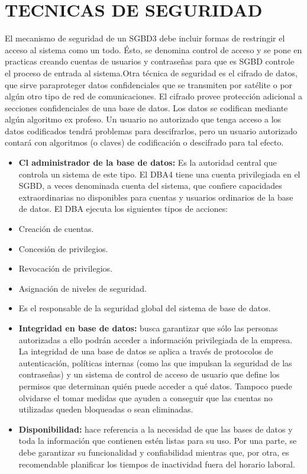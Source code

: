 \documentclass[conference]{IEEEtran}
\begin{document}
\section{TECNICAS DE SEGURIDAD}
El mecanismo de seguridad de un SGBD3 debe incluir formas de restringir el acceso al sistema como un todo. Ésto, se denomina control de acceso y se pone en practicas creando cuentas de usuarios y contraseñas para que es SGBD controle el proceso de entrada al sistema.Otra técnica de seguridad es el cifrado de datos, que sirve paraproteger datos confidenciales que se transmiten por satélite o por algún otro tipo de red de comunicaciones. El cifrado provee protección adicional a secciones confidenciales de una base de datos. Los datos se codifican mediante algún algoritmo ex profeso. Un usuario no autorizado que tenga acceso a los datos codificados tendrá problemas para descifrarlos, pero un usuario autorizado contará con algoritmos (o claves) de codificación o descifrado para tal efecto. 


\begin{itemize}
\item \textbf{Cl administrador de la base de datos: }Es la autoridad central que controla un sistema de este tipo. El DBA4 tiene una cuenta privilegiada en el SGBD, a veces denominada cuenta del sistema, que confiere capacidades extraordinarias no disponibles para cuentas y usuarios ordinarios de la base de datos. El DBA ejecuta los siguientes tipos de acciones:
\item \textbf{} Creación de cuentas.
\item \textbf{}Concesión de privilegios.
\item \textbf{}Revocación de privilegios.
\item \textbf{}Asignación de niveles de seguridad.
\item \textbf{}Es el responsable de la seguridad global del sistema de base de datos.


\item \textbf{Integridad en base de datos:} busca garantizar que sólo las personas autorizadas a ello podrán acceder a información privilegiada de la empresa. La integridad de una base de datos se aplica a través de protocolos de autenticación, políticas internas (como las que impulsan la seguridad de las contraseñas) y un sistema de control de acceso de usuario que define los permisos que determinan quién puede acceder a qué datos. Tampoco puede olvidarse el tomar medidas que ayuden a conseguir que las cuentas no utilizadas queden bloqueadas o sean eliminadas.
\item \textbf{Disponibilidad:} hace referencia a la necesidad de que las bases de datos y toda la información que contienen estén listas para su uso. Por una parte, se debe garantizar su funcionalidad y confiabilidad mientras que, por otra, es recomendable planificar los tiempos de inactividad fuera del horario laboral.
\end{itemize}
\\
\end{document}

